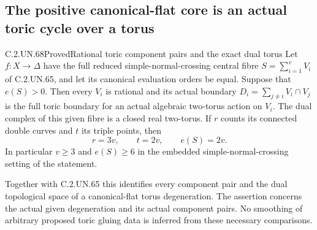 \subsection{The positive canonical-flat core is an actual toric cycle over a torus}

\begin{statement}{C.2.UN.68}{Proved}{Rational toric component pairs and the exact dual torus}
Let $f:X\to\Delta$ have the full reduced simple-normal-crossing
central fibre $S=\sum_{i=1}^{v}V_i$ of C.2.UN.65, and let its
canonical evaluation orders be equal. Suppose that $e(S)>0$.
Then every $V_i$ is rational and its actual boundary
$D_i=\sum_{j\ne i}V_i\cap V_j$ is the full toric boundary
for an actual algebraic two-torus action on $V_i$.
The dual complex of this given fibre is a closed real
two-torus. If $r$ counts its connected double curves and
$t$ its triple points, then
\[
                  r=3v,\qquad t=2v,\qquad e(S)=2v.
\tag{C.TC.1}
\]
In particular $v\ge3$ and $e(S)\ge6$ in the embedded
simple-normal-crossing setting of the statement.

Together with C.2.UN.65 this identifies every component
pair and the dual topological space of a canonical-flat
torus degeneration. The assertion concerns the actual
given degeneration and its actual component pairs.
No smoothing of arbitrary proposed toric gluing data
is inferred from these necessary comparisons.
\end{statement}


